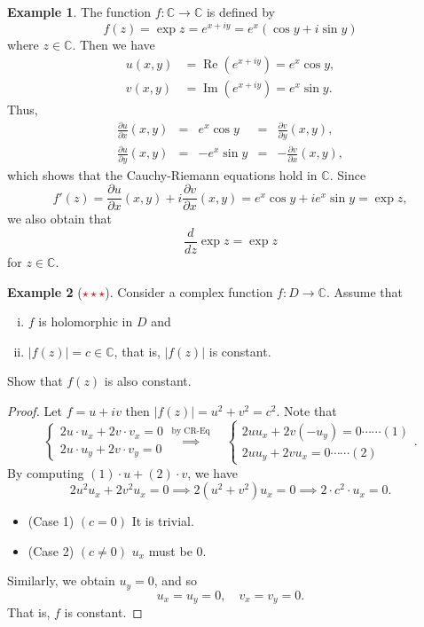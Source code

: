 \documentclass[12pt,openany]{book}
\theoremstyle{definition}
\newtheorem{example}{Example}[section]
\newcommand{\C}{\mathbb{C}}
\newcommand{\of}[1]{\left( #1 \right)}
\newcommand{\abs}[1]{\left\lvert #1 \right\rvert}
\renewcommand{\Re}{\operatorname{Re}}
\renewcommand{\Im}{\operatorname{Im}}
\begin{document}
	\begin{example}
		The function $f:\C\to\C$ is defined by \[
		f\of{z}=\exp z=e^{x+iy}=e^x\of{\cos y+i\sin y}
		\] where $z\in\C$. Then we have \begin{align*}
			u(x,y)&=\Re\of{e^{x+iy}}=e^x\cos y,\\
			v(x,y)&=\Im\of{e^{x+iy}}=e^x\sin y.
		\end{align*} Thus, \begin{align*}
			\frac{\partial u}{\partial x}\of{x,y} &=& e^x\cos y &=& \frac{\partial v}{\partial y}\of{x,y},\\
			\frac{\partial u}{\partial y}\of{x,y} &=& -e^x\sin y &=& -\frac{\partial v}{\partial x}\of{x,y},
		\end{align*} which shows that the Cauchy-Riemann equations hold in $\C$. Since \[
		f'\of{z}=\frac{\partial u}{\partial x}\of{x,y}+i\frac{\partial v}{\partial x}\of{x,y}=e^x\cos y+ie^x\sin y=\exp z,
		\] we also obtain that \[
		\frac{d}{dz}\exp z=\exp z
		\] for $z\in\C$.
	\end{example}
	
	\begin{example}[\textcolor{red}{$\star\star\star$}]
		Consider a complex function $f:D\to\C$. Assume that \begin{enumerate}[(i)]
			\item $f$ is holomorphic in $D$ and
			\item $\abs{f(z)}=c\in\C$, that is, $\abs{f(z)}$ is constant.
		\end{enumerate} Show that $f(z)$ is also constant.
		\begin{proof}
			Let $f=u+iv$ then $\abs{f(z)}=u^2+v^2=c^2$. Note that \[
			\begin{cases}
				2u\cdot u_x+2v\cdot v_x=0\\
				2u\cdot u_y+2v\cdot v_y=0
			\end{cases}\overset{\text{by CR-Eq}}{\implies}\quad\begin{cases}
				2uu_x+2v(-u_y)=0 \cdots\cdots(1)\\
				2uu_y+2vu_x=0 \cdots\cdots(2)
			\end{cases}.
			\] By computing $(1)\cdot u+(2)\cdot v$, we have \[
			2u^2u_x+2v^2u_x=0\implies 2(u^2+v^2)u_x=0\implies 2\cdot c^2\cdot u_x=0.
			\]
			\begin{itemize}
				\item[] (Case 1) $(c=0)$ It is trivial.
				\item[] (Case 2) $(c\neq 0)$ $u_x$ must be $0$.
			\end{itemize} Similarly, we obtain $u_y=0$, and so \[
			u_x=u_y=0,\quad v_x=v_y=0.
			\] That is, $f$ is constant.
		\end{proof}
	\end{example}
	
\end{document}
